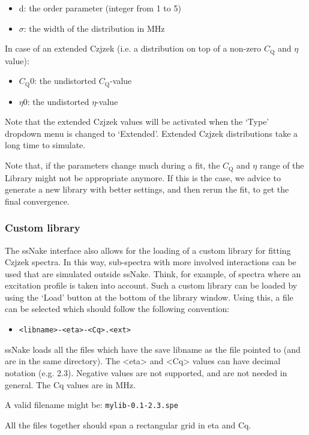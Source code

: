 \documentclass[11pt,a4paper]{article}
\begin{document}
\begin{itemize}
\item d: the order parameter (integer from 1 to 5)
\item $\sigma$: the width of the distribution in MHz
\end{itemize}
In case of an extended Czjzek (i.e. a distribution on top of a non-zero $C_\text{Q}$ and $\eta$
value):
\begin{itemize}
  \item $C_\text{Q}0$: the undistorted $C_\text{Q}$-value
  \item $\eta0$: the undistorted $\eta$-value
\end{itemize}
Note that the extended Czjzek values will be activated when the `Type' dropdown menu is changed to
`Extended'. Extended Czjzek distributions take a long time to simulate. 

Note that, if the parameters change much during a fit, the $C_\text{Q}$ and $\eta$ range of the
Library might not be appropriate anymore. If this is the case, we advice to generate a new library
with better settings, and then rerun the fit, to get the final convergence.

\subsubsection*{Custom library}\label{sec:CzjzekCustom}
The ssNake interface also allows for the loading of a custom library for fitting Czjzek spectra. In this way, sub-spectra with more involved interactions can be used that are simulated outside ssNake. Think, for example, of spectra where an excitation profile is taken into account. Such a custom library can be loaded by using the `Load' button at the bottom of the library window. Using this, a file can be selected which should follow the following convention:

\begin{itemize}
\item \texttt{<libname>-<eta>-<Cq>.<ext>}
\end{itemize}
ssNake loads all the files which have the save libname as the file pointed to (and are in the same directory). The <eta> and <Cq> values can have decimal notation (e.g. 2.3). Negative values are not supported, and are not needed in general. The Cq values are in MHz.

A valid filename might be: \texttt{mylib-0.1-2.3.spe}

All the files together should span a rectangular grid in eta and Cq.
\end{document}

